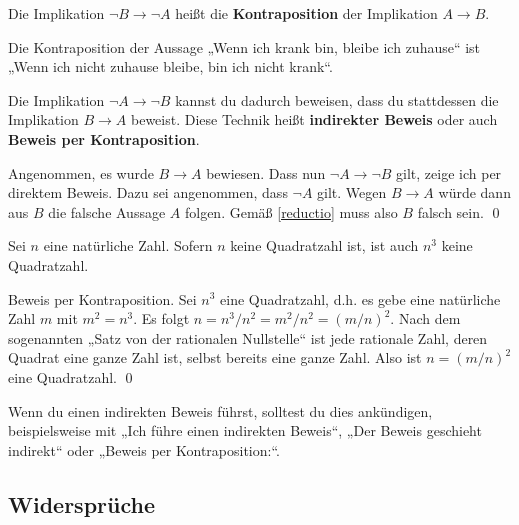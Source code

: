 \begin{de} 
 Die Implikation $\neg B \to \neg A$ heißt die \textbf{Kontraposition} der Implikation $A\to B$. 
\end{de}


\begin{bsp}
    Die Kontraposition der Aussage „Wenn ich krank bin, bleibe ich zuhause“ ist „Wenn ich nicht zuhause bleibe, bin ich nicht krank“.
\end{bsp}


\begin{satz} \label{indirekterbeweis} 
    Die Implikation $\neg A\to \neg B$ kannst du dadurch beweisen, dass du stattdessen die Implikation $B\to A$ beweist. Diese Technik heißt \textbf{indirekter Beweis} oder auch \textbf{Beweis per Kontraposition}.
\end{satz}


\begin{bew}
    Angenommen, es wurde $B\to A$ bewiesen. Dass nun $\neg A\to \neg B$ gilt, zeige ich per direktem Beweis. Dazu sei angenommen, dass $\neg A$ gilt. Wegen $B\to A$ würde dann aus $B$ die falsche Aussage $A$ folgen. Gemäß \cref{reductio} muss also $B$ falsch sein. \qed
\end{bew}


\begin{bsp}
    Sei $n$ eine natürliche Zahl. Sofern $n$ keine Quadratzahl ist, ist auch $n^3$ keine Quadratzahl.
\end{bsp}


\begin{bew}
    Beweis per Kontraposition. Sei $n^3$ eine Quadratzahl, d.h. es gebe eine natürliche Zahl $m$ mit $m^2=n^3$. Es folgt $n=n^3/n^2=m^2/n^2 = (m/n)^2$. Nach dem sogenannten „Satz von der rationalen Nullstelle“ ist jede rationale Zahl, deren Quadrat eine ganze Zahl ist, selbst bereits eine ganze Zahl. Also ist $n=(m/n)^2$ eine Quadratzahl. \qed
\end{bew}
  
  
\begin{bem}[Signalwörter]
    Wenn du einen indirekten Beweis führst, solltest du dies ankündigen, beispielsweise mit „Ich führe einen indirekten Beweis“, „Der Beweis geschieht indirekt“ oder „Beweis per Kontraposition:“.
\end{bem}





\subsection*{Widersprüche}



